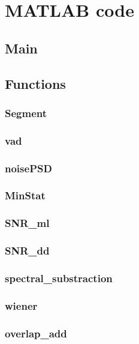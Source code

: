 \onecolumn
\appendices \label{sec:appendix}

\section{MATLAB code}
\subsection{Main}

\clearpage
\subsection{Functions}
\subsubsection{Segment}

\subsubsection{vad}

\subsubsection{noisePSD}

\subsubsection{MinStat}

\subsubsection{SNR\_ml}

\subsubsection{SNR\_dd}

\subsubsection{spectral\_substraction}

\subsubsection{wiener}

\subsubsection{overlap\_add}


